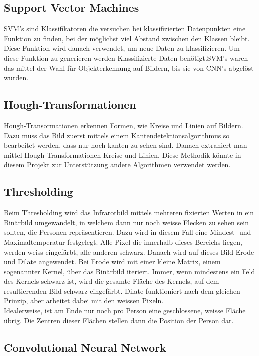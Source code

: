 \subsection{Support Vector Machines}

\gls{SVM}'s sind Klassifikatoren die versuchen bei klassifizierten Datenpunkten eine Funktion zu finden, bei der möglichst viel Abstand zwischen den Klassen bleibt. Diese Funktion wird danach verwendet, um neue Daten zu klassifizieren. Um diese Funktion zu generieren werden Klassifizierte Daten benötigt.\gls{SVM}'s waren das mittel der Wahl für Objekterkennung auf Bildern, bis sie von \gls{CNN}'s abgelöst wurden.

\subsection{Hough-Transformationen}

Hough-Transormationen erkennen Formen, wie Kreise und Linien auf Bildern. Dazu muss das Bild zuerst mittels einem Kantendetektionsalgorithmus so bearbeitet werden, dass nur noch kanten zu sehen sind. Danach extrahiert man mittel Hough-Transformationen Kreise und Linien. Diese Methodik könnte in diesem Projekt zur Unterstützung andere Algorithmen verwendet werden.


\subsection{Thresholding}

Beim Thresholding wird das Infrarotbild mittels mehreren fixierten Werten in ein Binärbild umgewandelt, in welchem dann nur noch weisse Flecken zu sehen sein sollten, die Personen repräsentieren. Dazu wird in diesem Fall eine Mindest- und Maximaltemperatur festgelegt. Alle Pixel die innerhalb dieses Bereichs liegen, werden weiss eingefärbt, alle anderen schwarz. Danach wird auf dieses Bild \gls{Erode} und \gls{Dilate} angewendet. Bei \gls{Erode} wird mit einer kleine Matrix, einem sogenannter Kernel, über das Binärbild iteriert. Immer, wenn mindestens ein Feld des Kernels schwarz ist, wird die gesamte Fläche des Kernels, auf dem resultierenden Bild schwarz eingefärbt. \gls{Dilate} funktioniert nach dem gleichen Prinzip, aber arbeitet dabei mit den weissen Pixeln.\\
Idealerweise, ist am Ende nur noch pro Person eine geschlossene, weisse Fläche übrig. Die Zentren dieser Flächen stellen dann die Position der Person dar.


\subsection{Convolutional Neural Network}

